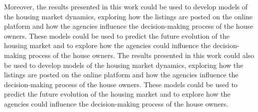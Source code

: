 Moreover, the results presented in this work could be used to develop models of the housing market dynamics, exploring how the listings are posted on the online platform and how the agencies influence the decision-making process of the house owners. These models could be used to predict the future evolution of the housing market and to explore how the agencies could influence the decision-making process of the house owners. The results presented in this work could also be used to develop models of the housing market dynamics, exploring how the listings are posted on the online platform and how the agencies influence the decision-making process of the house owners. These models could be used to predict the future evolution of the housing market and to explore how the agencies could influence the decision-making process of the house owners.











